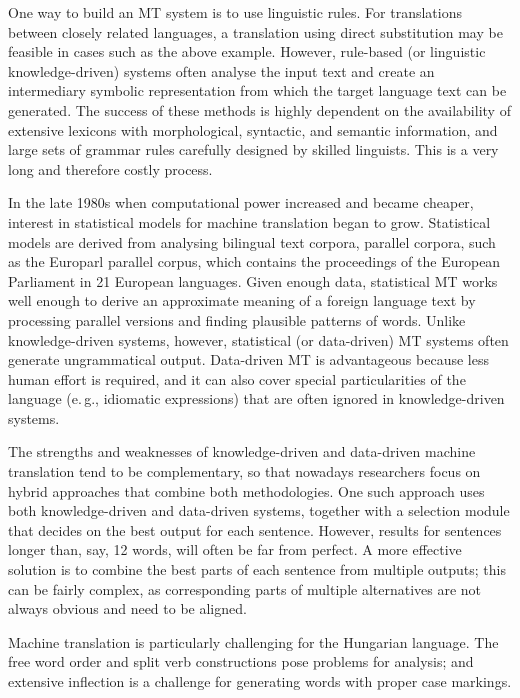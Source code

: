 \begin{multicols}{2}
  One way to build an MT system is to use linguistic rules. For translations between closely related languages, a translation using direct substitution may be feasible in cases such as the above example. However, rule-based (or linguistic knowledge-driven) systems often analyse the input text and create an intermediary symbolic representation from which the target language text can be generated. The success of these methods is highly dependent on the availability of extensive lexicons with morphological, syntactic, and semantic information, and large sets of grammar rules carefully designed by skilled linguists. This is a very long and therefore costly process.

  In the late 1980s when computational power increased and became cheaper, interest in statistical models for machine translation began to grow. Statistical models are derived from analysing bilingual text corpora, parallel corpora, such as the Europarl parallel corpus, which contains the proceedings of the European Parliament in 21 European languages. Given enough data, statistical MT works well enough to derive an approximate meaning of a foreign language text by processing parallel versions and finding plausible patterns of words. Unlike knowledge-driven systems, however, statistical (or data-driven) MT systems often generate ungrammatical output. Data-driven MT is advantageous because less human effort is required, and it can also cover special particularities of the language (e.\,g., idiomatic expressions) that are often ignored in knowledge-driven systems. 

  The strengths and weaknesses of knowledge-driven and data-driven machine translation tend to be complementary, so that nowadays researchers focus on hybrid approaches that combine both methodologies. One such approach uses both knowledge-driven and data-driven systems, together with a selection module that decides on the best output for each sentence. However, results for sentences longer than, say, 12 words, will often be far from perfect. A more effective solution is to combine the best parts of each sentence from multiple outputs; this can be fairly complex, as corresponding parts of multiple alternatives are not always obvious and need to be aligned. 


  Machine translation is particularly challenging for the Hungarian language. The free word order and split verb constructions pose problems for analysis; and extensive inflection is a challenge for generating words with proper case markings.


\end{multicols}
